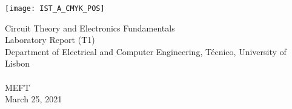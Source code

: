 
\thispagestyle {empty}

\texttt{[image: IST\_A\_CMYK\_POS]}

\begin{center}
%
\vspace{1.0cm}

\vspace{1cm}
{\FontLb Circuit Theory and Electronics Fundamentals} \\ %
\vspace{1cm}
{\FontLb Laboratory Report (T1)} \\
\vspace{1cm}
{\FontSn Department of Electrical and Computer Engineering, Técnico, University of Lisbon} \\ %
\vspace{0.5cm}
{ } \\
\vspace{0.5cm}
{\FontSn MEFT } \\
\vspace{0.5cm}
{\FontSn March 25, 2021} \\ %
%
\end{center}

